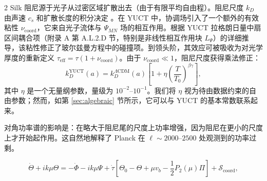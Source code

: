 \documentclass[11pt,a4paper]{article}
\begin{document}
\begin{multicols}{2}
		Silk 阻尼源于光子从过密区域扩散出去（由于有限平均自由程）。阻尼尺度 $k_D$ 由声速 $c_s$ 和扩散长度的积分决定 \cite{Silk1968}。在 YUCT 中，协调场引入了一个额外的有效粘性 $\nu_{\mathrm{coord}}$，它来自光子流体与 $\Psi_{MN}$ 场的相互作用。根据 YUCT 拉格朗日量中扇区间耦合项（附录 A 第 A.L.2.D 节，特别是非线性相互作用块 $L_{\Psi}$）的详细推导，该粘性修正了玻尔兹曼方程中的碰撞项。到领头阶，其效应可被吸收为对光学厚度的重新定义 $\tau_{\mathrm{eff}} = \tau (1 + \nu_{\mathrm{coord}})$。由于 $\nu_{\mathrm{coord}} \ll 1$，阻尼尺度获得乘法修正：
		\begin{equation}
			k_D^{\text{YUCT}}(a) = k_D^{\Lambda\text{CDM}}(a) \left[1 + \eta \left(\frac{T}{T_0}\right)^{\beta\gamma}\right],
			\label{eq:kD}
		\end{equation}
		其中 $\eta$ 是一个无量纲参数，量级为 $10^{-2}$--$10^{-1}$。我们将 $\eta$ 视为待由数据约束的自由参数；然而，如第 \ref{sec:algebraic} 节所示，它可以与 YUCT 的基本常数联系起来。
		
		对角功率谱的影响是：在略大于阻尼尾的尺度上功率增强，因为阻尼在更小的尺度上才开始起作用。这自然地解释了 Planck 在 $\ell \sim 2000$--$2500$ 处观测到的功率过剩。
		
	\end{multicols}
	
	\begin{equation}
		\dot{\Theta} + ik\mu\Theta = -\dot{\Phi} - ik\mu\Psi + \dot{\tau}\left[\Theta_0 - \Theta + \mu v_b - \frac{1}{2}P_2(\mu)\Pi\right] + \mathcal{S}_{\mathrm{coord}},
		\label{eq:boltzmann}
	\end{equation}
	
\end{document}
